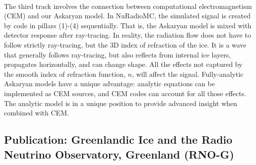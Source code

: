 \documentclass[../../../main.tex]{subfiles}
\begin{document}
\\
\vspace{0.15cm}
The third track involves the connection between computational electromagnetism (CEM) and our Askaryan model. In NuRadioMC, the simulated signal is created by code in pillars (1)-(4) sequentially. That is, the Askaryan model is mixed with detector response after ray-tracing. In reality, the radiation flow does not have to follow strictly ray-tracing, but the 3D index of refraction of the ice. It is a wave that generally follows ray-tracing, but also reflects from internal ice layers, propagates horizontally, and can change shape. All the effects not captured by the smooth index of refraction function, $n$, will affect the signal.  Fully-analytic Askaryan models have a unique advantage: analytic equations can be implemented as CEM sources, and CEM codes can account for all those effects. The analytic model is in a unique position to provide advanced insight when combined with CEM.

\subsection{Publication: Greenlandic Ice and the Radio Neutrino Observatory, Greenland (RNO-G)}
\end{document}
